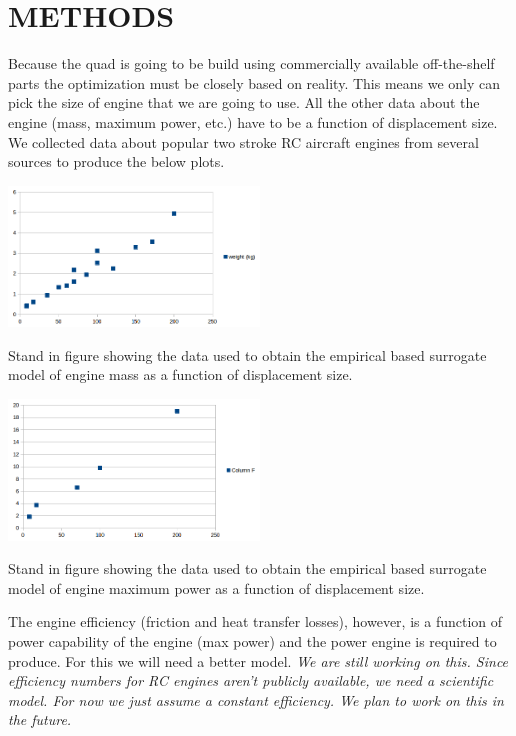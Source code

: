 \documentclass[letterpaper, 10 pt, conference]{ieeeconf}  %
\makeatletter
\newenvironment{figurehere}
  {\def\@captype{figure}}
  {}
\makeatother
\begin{document}
	
\section{METHODS}

Because the quad is going to be build using commercially available off-the-shelf parts the optimization must be closely based on reality.  This means we only can pick the size of engine that we are going to use.  All the other data about the engine (mass, maximum power, etc.) have to be a function of displacement size.  We collected data about popular two stroke RC aircraft engines from several sources to produce the below plots. 

\begin{figurehere}
	\includegraphics[width=0.5\textwidth]{mass.png}
	\caption{Stand in figure showing the data used to obtain the empirical based surrogate model of engine mass as a function of displacement size.}
		\label{fig:mass}
\end{figurehere}

\begin{figurehere}
	\includegraphics[width=0.5\textwidth]{max_power.png}
	\caption{Stand in figure showing the data used to obtain the empirical based surrogate model of engine maximum power as a function of displacement size.}
		\label{fig:power}
\end{figurehere}

The engine efficiency (friction and heat transfer losses), however, is a function of power capability of the engine (max power) and the power engine is required to produce.  For this we will need a better model.  \textit{We are still working on this. Since efficiency numbers for RC engines aren't publicly available, we need a scientific model.  For now we just assume a constant efficiency. We plan to work on this in the future.} 
\end{document}
